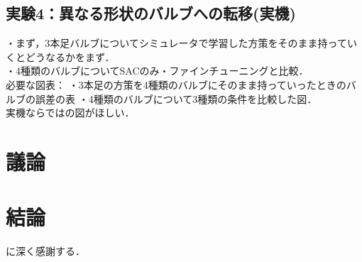 \documentclass[dvipdfmx]{ampbt_nomag}
\def\numberofspines{1}
\begin{document}
\subsection{実験4：異なる形状のバルブへの転移(実機)}
・まず，3本足バルブについてシミュレータで学習した方策をそのまま持っていくとどうなるかをまず．\\
・4種類のバルブについてSACのみ・ファインチューニングと比較．\\
必要な図表：
・3本足の方策を4種類のバルブにそのまま持っていったときのバルブの誤差の表
・4種類のバルブについて3種類の条件を比較した図．\\
実機ならではの図がほしい．



\section{議論}\label{sec-discussion}

\section{結論}\label{sec-conclusion}



\acknowledgment
に深く感謝する．




\appendix


\fi
\ifoutputcover
\cleardoublepage
\makecover                      %
\makespine[\numberofspines]     %
\fi
\ifoutputabstractforsubmission
\makeabstractforsubmission      %
\fi
\end{document}
